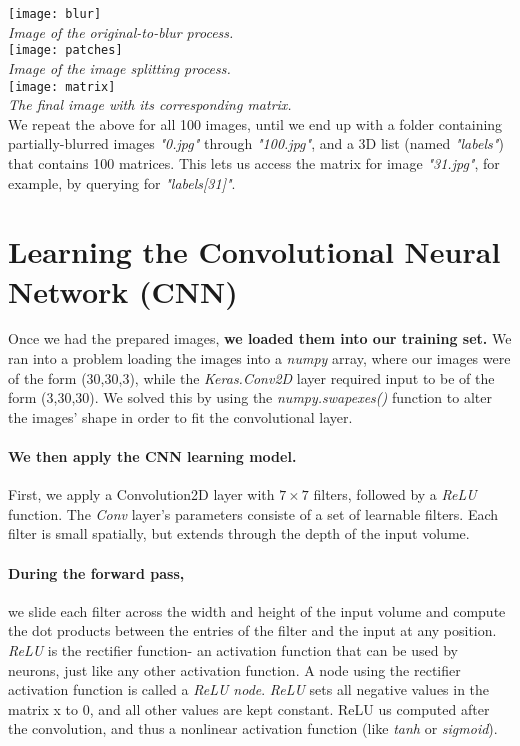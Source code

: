 \documentclass{article}
\begin{document}
\texttt{[image: blur]} \\
\textit{Image of the original-to-blur process.} \\ 
\texttt{[image: patches]} \\
\textit{Image of the image splitting process.} \\
\texttt{[image: matrix]} \\
\textit{The final image with its corresponding matrix.} \\

We repeat the above for all 100 images, until we end up with a folder containing 
partially-blurred images \textit{"0.jpg"} through \textit{"100.jpg"}, and a 3D list 
(named \textit{"labels"}) that contains 100 matrices. This lets us access the matrix for 
image \textit{"31.jpg"}, for example, by querying for \textit{"labels[31]"}.

\section{Learning the Convolutional Neural Network (CNN)}
Once we had the prepared images, \textbf{we loaded them into our training set.} We ran 
into a problem loading the images into a \textit{numpy} array, where our images were of 
the form (30,30,3), while the \textit{Keras.Conv2D} layer required input to be of the form 
(3,30,30). We solved this by using the \textit{numpy.swapexes()} function to alter the 
images' shape in order to fit the convolutional layer.

\paragraph{We then apply the CNN learning model.}
First, we apply a Convolution2D layer with $7\times7$ filters, followed by a \textit{ReLU} 
function. The \textit{Conv} layer's parameters consiste of a set of learnable filters. 
Each filter is small spatially, but extends through the depth of the input volume. 

\paragraph{During the forward pass,} 
we slide each filter across the width and height of the input 
volume and compute the dot products between the entries of the filter and the input at 
any position. \textit{ReLU} is the rectifier function- an activation function that can be 
used by neurons, just like any other activation function. A node using the rectifier 
activation function is called a \textit{ReLU node}. \textit{ReLU} sets all negative values 
in the matrix x to 0, and all other values are kept constant. ReLU us computed after the 
convolution, and thus a nonlinear activation function (like \textit{tanh} or 
\textit{sigmoid}).
\end{document}
